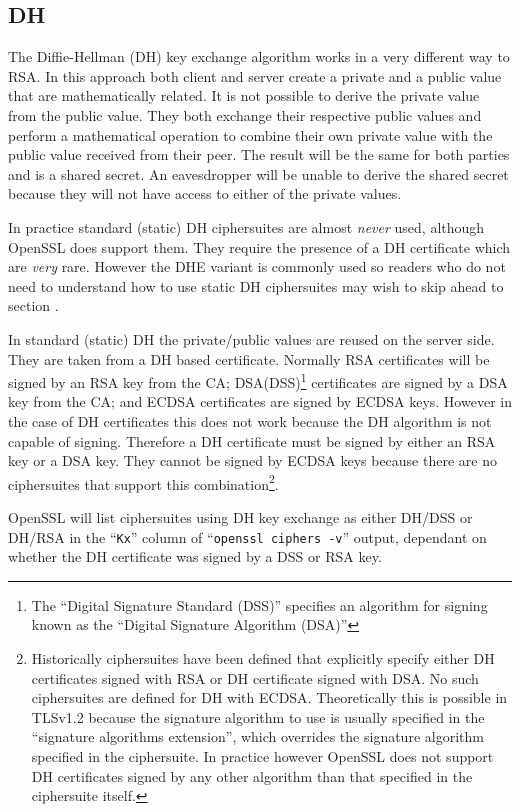 \subsection{DH}

The Diffie-Hellman (DH) key exchange algorithm works in a very different way to 
RSA. In this approach both client and server create a private and a public
value that are mathematically related. It is not possible to derive the private 
value from the public value. They both exchange their respective public values 
and perform a mathematical operation to combine their own private value with 
the public value received from their peer. The result will be the same for both 
parties and is a shared secret. An eavesdropper will be unable to derive the 
shared secret because they will not have access to either of the private 
values.

In practice standard (static) DH ciphersuites are almost \emph{never} used, 
although OpenSSL does support them. They require the presence of a DH
certificate which are \emph{very} rare. However the DHE variant is commonly used 
so readers who do not need to understand how to use static DH ciphersuites may
wish to skip ahead to section .

In standard (static) DH the private/public values are reused on the server 
side. They are taken from a DH based certificate. Normally RSA certificates 
will be signed by an RSA key from the CA; DSA(DSS)\footnote{The ``Digital 
Signature Standard (DSS)'' specifies an algorithm for signing known as the 
``Digital Signature Algorithm (DSA)''} certificates 
are signed by a DSA key from the CA; and ECDSA certificates are signed by ECDSA 
keys. However in the case of DH certificates this does not work because the DH
algorithm is not capable of signing. Therefore a DH certificate must be signed 
by either an RSA key or a DSA key. They cannot be signed by ECDSA keys because 
there are no ciphersuites that support this combination\footnote{Historically 
ciphersuites have been defined that explicitly specify either DH certificates 
signed with RSA or DH certificate signed with DSA. No such ciphersuites are 
defined for DH with ECDSA. Theoretically this is possible in TLSv1.2 because 
the signature algorithm to use is usually specified in the 
``signature algorithms extension'', which overrides the signature algorithm 
specified in the ciphersuite. In practice however OpenSSL does not 
support DH certificates signed by any other algorithm than that specified in 
the ciphersuite itself.}.

OpenSSL will list ciphersuites using DH key exchange as either DH/DSS or DH/RSA 
in the ``\verb!Kx!'' column of ``\verb!openssl ciphers -v!'' output, dependant 
on whether the DH certificate was signed by a DSS or RSA key.
